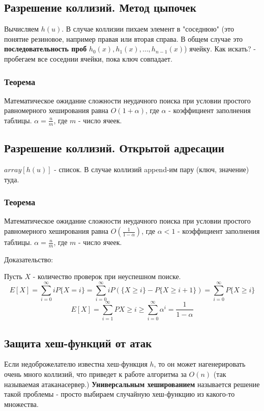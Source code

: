\subsection*{Разрешение коллизий. Метод цыпочек}
Вычисляем $h(u)$. В случае коллизии пихаем элемент в "соседнюю" (это понятие резиновое, например правая или вторая справа. В общем случае это {\bf последовательность проб} $h_0(x), h_1(x), …, h_{n-1}(x)$) ячейку.
Как искать? - пробегаем все соседнии ячейки, пока ключ совпадает.

\subsubsection*{Теорема}
Математическое ожидание сложности неудачного поиска
при условии простого равномерного хеширования равна
$O(1 + \alpha)$, где $\alpha$ - коэффициент заполнения таблицы.
$\alpha = \frac{n}{m}$, где $m$ - число ячеек. 

\subsection*{Разрешение коллизий. Открытой адресации}
$array[h(u)]$ - список. В случае коллизий append-им пару (ключ, значение) туда.


\subsubsection*{Теорема}
Математическое ожидание сложности неудачного поиска
при условии простого равномерного хеширования равна
$O(\frac{1}{1-\alpha})$, где $\alpha < 1$ - коэффициент заполнения таблицы.
$\alpha = \frac{n}{m}$, где $m$ - число ячеек. 

Доказательство:

Пусть $X$ - количество проверок при неуспешном поиске.
$$E[X] = \sum\limits_{i=0}^{\infty}iP\{X = i\} = \sum\limits_{i=0}^{\infty}iP(\{X\ge i\} - P\{X\ge i+1\}) = \sum\limits_{i=0}^{\infty}P\{X \ge i\}$$
$$E[X] = \sum\limits_{i=1}^{\infty}P{X \ge i}\ge\sum\limits_{i=0}^{\infty}\alpha^i = \frac{1}{1-\alpha}$$ 

\subsection*{Защита хеш-функций от атак}
Если недоброжелателю известна хеш-функция $h$, то он может нагенерировать очень много коллизий, что приведет к работе алгоритма за $O(n)$ (так называемая $атака на сервер.$)
{\bf Универсальным хешированием} называется решение такой проблемы - просто выбираем случайную хеш-функцию из какого-то множества.
